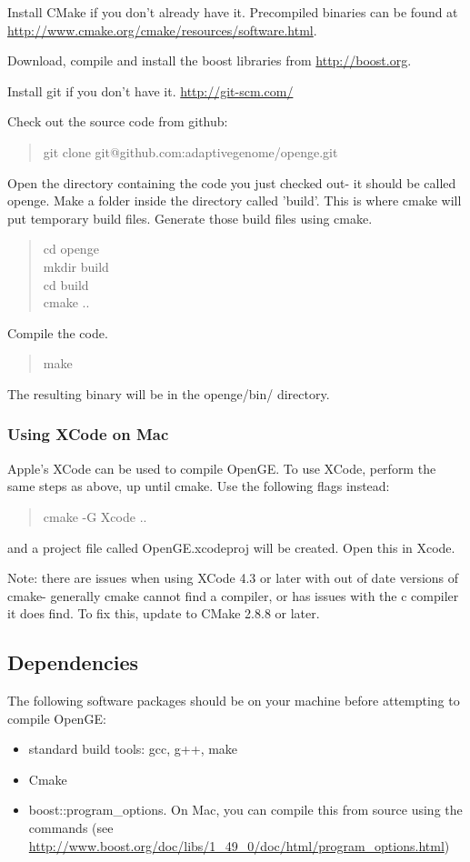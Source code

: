 \documentclass[11pt]{article}
\newcommand {\cmd}[1] {\begin{quote}#1\end{quote}}
\begin{document}
Install CMake if you don't already have it. Precompiled binaries can be found at \url{http://www.cmake.org/cmake/resources/software.html}.

Download, compile and install the boost libraries from \url{http://boost.org}.

Install git if you don't have it. \url{http://git-scm.com/}

Check out the source code from github:
\cmd{git clone git@github.com:adaptivegenome/openge.git}

Open the directory containing the code you just checked out- it should be called openge. Make a folder inside the directory called 'build'. This is where cmake will put temporary build files. Generate those build files using cmake.
\cmd{cd openge\\mkdir build\\cd build\\cmake ..}

Compile the code.
\cmd{make}
The resulting binary will be in the openge/bin/ directory.

\subsubsection{Using XCode on Mac}
Apple's XCode can be used to compile OpenGE. To use XCode, perform the same steps as above, up until cmake. Use the following flags instead:
\cmd{cmake -G Xcode ..}
and a project file called OpenGE.xcodeproj will be created. Open this in Xcode.

Note: there are issues when using XCode 4.3 or later with out of date versions of cmake- generally cmake cannot find a compiler, or has issues with the c compiler it does find. To fix this, update to CMake 2.8.8 or later.

\subsection{Dependencies}
The following software packages should be on your machine before attempting to compile OpenGE:
\begin{itemize}
\item standard build tools: gcc, g++, make
\item Cmake
\item boost::program\_options. On Mac, you can compile this from source using the commands  (see \url{http://www.boost.org/doc/libs/1_49_0/doc/html/program_options.html})
\end{itemize}
\end{document}
